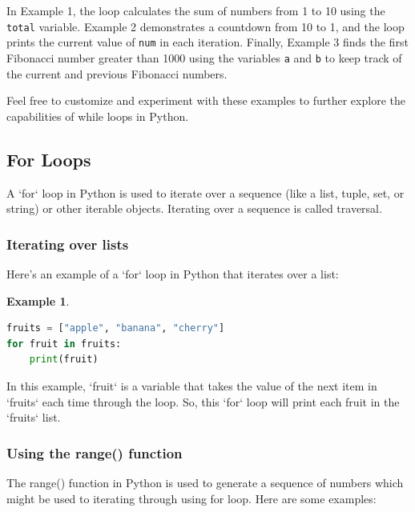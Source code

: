 \documentclass[12pt]{article}
\newtheorem{Example}{Example}[section]
\begin{document}
In Example 1, the loop calculates the sum of numbers from 1 to 10 using the \texttt{total} variable. Example 2 demonstrates a countdown from 10 to 1, and the loop prints the current value of \texttt{num} in each iteration. Finally, Example 3 finds the first Fibonacci number greater than 1000 using the variables \texttt{a} and \texttt{b} to keep track of the current and previous Fibonacci numbers.

Feel free to customize and experiment with these examples to further explore the capabilities of while loops in Python.

\subsection{For Loops}

A `for` loop in Python is used to iterate over a sequence (like a list, tuple, set, or string) or other iterable objects. Iterating over a sequence is called traversal. 

\subsubsection{Iterating over lists}
Here's an example of a `for` loop in Python that iterates over a list:
\begin{Example}
\begin{lstlisting}[language=Python]
fruits = ["apple", "banana", "cherry"]
for fruit in fruits:
    print(fruit)
\end{lstlisting}
\end{Example}
In this example, `fruit` is a variable that takes the value of the next item in `fruits` each time through the loop. So, this `for` loop will print each fruit in the `fruits` list.

\subsubsection{Using the range() function}

The range() function in Python is used to generate a sequence of numbers which might be used to iterating through using for loop. Here are some examples:
\end{document}
